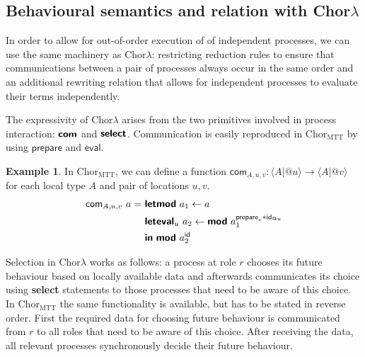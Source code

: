 \documentclass{scrartcl}
\theoremstyle{definition}
\newtheorem{example}{Example}
\theoremstyle{plain}
\newcommand{\primitive}[1]{\textsf{\textbf{#1}}}
\newcommand{\ChorMTT}{Chor${}_{\textrm{MTT}}$}
\begin{document}
\subsection{Behavioural semantics and relation with \texorpdfstring{Chor$\lambda$}{ChorLambda}}

In order to allow for out-of-order execution of of independent processes, we can use
the same machinery as Chor$\lambda$: restricting reduction rules to ensure that
communications between a pair of processes always occur in the same order and an
additional rewriting relation that allows for independent processes to evaluate
their terms independently.

The expressivity of Chor$\lambda$ arises from the two primitives involved in
process interaction: $\primitive{com}$ and $\primitive{select}$. Communication is
easily reproduced in \ChorMTT{} by using $\textsf{prepare}$ and $\textsf{eval}$.
\begin{example}
In \ChorMTT, we can define a function $\textsf{com}_{A,u,v} : \langle A | @u
\rangle \to \langle A | @v \rangle$ for each local type $A$ and pair of locations
$u,v$.
\begin{align*}\setlength{\jot}{0.5ex}
  \textsf{com}_{A,u,v}\ a =
  \ & \primitive{letmod}\ a_1 \leftarrow a\\
    & \primitive{leteval}_u\ a_2 \leftarrow
        \primitive{mod}\ a_1^{\textsf{prepare}_v * \textsf{id}_{@u}}\\
    & \primitive{in}\ \primitive{mod}\ a_2^{\textsf{id}}
\end{align*}
\end{example}
Selection in Chor$\lambda$ works as follows: a process at role $r$
chooses its future behaviour based on locally available data and afterwards
communicates its choice using \primitive{select} statements to those processes that need to
be aware of this choice. In \ChorMTT{} the same functionality is available, but has
to be stated in reverse order. First the required data for choosing future
behaviour is communicated from $r$ to all roles that need to be aware of this
choice. After receiving the data, all relevant processes synchronously decide
their future behaviour.
\end{document}
